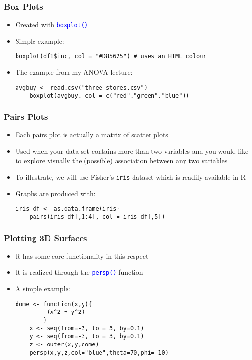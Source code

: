 \documentclass[10pt]{beamer}
\newcommand{\cc}[1]{\texttt{\textcolor{blue}{#1}}}
\theoremstyle{definition}
\begin{document}
\begin{frame}[fragile]
\frametitle{Box Plots}
\begin{itemize}
	\item Created with \cc{boxplot()}
	\item Simple example:
	\begin{lstlisting}[style = rstyle, breaklines]
	boxplot(df1$inc, col = "#D85625") # uses an HTML colour
	\end{lstlisting}
	\item The example from my ANOVA lecture:
	\begin{lstlisting}[style = rstyle, breaklines]
	avgbuy <- read.csv("three_stores.csv")
	boxplot(avgbuy, col = c("red","green","blue"))
	\end{lstlisting}
\end{itemize}
\end{frame}

\begin{frame}[fragile]
\frametitle{Pairs Plots}
\begin{itemize}
	\item Each pairs plot is actually a matrix of scatter plots
	\item Used when your data set contains more than two variables and you would like to explore visually the (possible) association between any two variables
	\item To illustrate, we will use Fisher's \texttt{iris} dataset which is readily available in R
	\item Graphs are produced with:
	\begin{lstlisting}[style = rstyle, breaklines]
	iris_df <- as.data.frame(iris)
	pairs(iris_df[,1:4], col = iris_df[,5])	
	\end{lstlisting}	
\end{itemize}
\end{frame}

\begin{frame}[fragile]
\frametitle{Plotting 3D Surfaces}
\begin{itemize}
	\item R has some core functionality in this respect
	\item It is realized through the \cc{persp()} function
	\item A simple example:
	\begin{lstlisting}[style = rstyle, breaklines]
	dome <- function(x,y){
		-(x^2 + y^2)
		}
	x <- seq(from=-3, to = 3, by=0.1)
	y <- seq(from=-3, to = 3, by=0.1)
	z <- outer(x,y,dome)
	persp(x,y,z,col="blue",theta=70,phi=-10)
	\end{lstlisting}
\end{itemize}
\end{frame}
\end{document}
